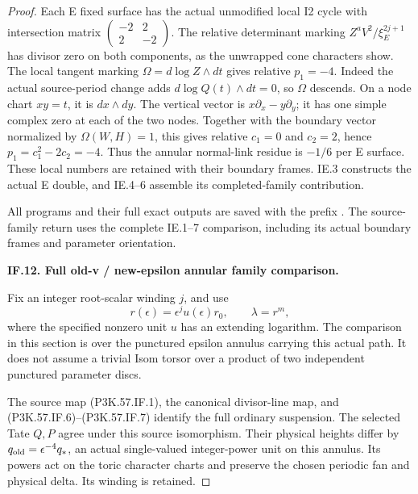 \begin{proof}
Each E fixed surface has the actual unmodified local I2 cycle
with intersection matrix \(\left(\begin{smallmatrix}-2&2\\2&-2\end{smallmatrix}\right)\).
The relative determinant marking \(Z^aV^2/\xi_E^{2j+1}\)
has divisor zero on both components, as the unwrapped cone
characters show. The local tangent marking
\(\Omega=d\log Z\wedge dt\) gives relative
\(p_1=-4\). Indeed the actual source-period change adds
\(d\log Q(t)\wedge dt=0\), so \(\Omega\) descends.
On a node chart \(xy=t\), it is \(dx\wedge dy\).
The vertical vector is \(x\partial_x-y\partial_y\);
it has one simple complex zero at each of the two nodes.
Together with the boundary vector normalized by
\(\Omega(W,H)=1\), this gives relative \(c_1=0\)
and \(c_2=2\), hence \(p_1=c_1^2-2c_2=-4\).
Thus the annular normal-link residue is \(-1/6\) per
E surface. These local numbers are retained with their
boundary frames. IE.3 constructs the actual E double,
and IE.4--6 assemble its completed-family contribution.

All programs and their full exact outputs are saved with the prefix
.
The source-family return uses the complete IE.1--7 comparison,
including its actual boundary frames and parameter orientation.

\par\medskip\noindent\textbf{IF.12. Full old-v / new-epsilon annular family comparison.}\par\nopagebreak[4]

Fix an integer root-scalar winding \(j\), and use
\[
 r(\epsilon)=\epsilon^j u(\epsilon)r_0,\qquad
 \lambda=r^m ,
\]
where the specified nonzero unit \(u\) has an extending
logarithm. The comparison in this section is over the
punctured epsilon annulus carrying this actual path.
It does not assume a trivial Isom torsor over a product
of two independent punctured parameter discs.

The source map (P3K.57.IF.1), the canonical divisor-line map,
and (P3K.57.IF.6)--\allowbreak (P3K.57.IF.7) identify the full ordinary suspension.
The selected Tate \(Q,P\) agree under this source
isomorphism. Their physical heights differ by
\(q_{\rm old}=\epsilon^{-4}q_*\), an actual single-valued
integer-power unit on this annulus. Its powers act on
the toric character charts and preserve the chosen
periodic fan and physical delta. Its winding is retained.


\end{proof}
